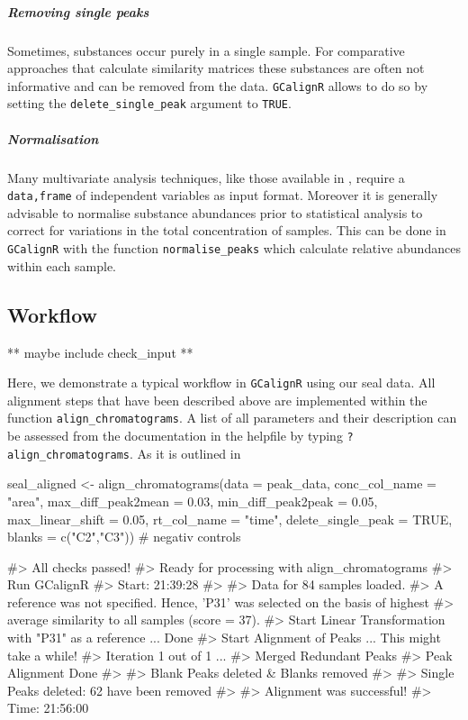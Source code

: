 \subparagraph{Removing single peaks}\label{removing-single-peaks}

Sometimes, substances occur purely in a single sample. For comparative
approaches that calculate similarity matrices these substances are often
not informative and can be removed from the data. \texttt{GCalignR}
allows to do so by setting the \texttt{delete\_single\_peak} argument to
\texttt{TRUE}.

\subparagraph{Normalisation}\label{normalisation}

Many multivariate analysis techniques, like those available in
, require a \texttt{data,frame} of independent variables as
input format. Moreover it is generally advisable to normalise substance
abundances prior to statistical analysis to correct for variations in
the total concentration of samples. This can be done in
\texttt{GCalignR} with the function \texttt{normalise\_peaks} which
calculate relative abundances within each sample.

\subsection{Workflow}\label{workflow}

** maybe include check\_input **

Here, we demonstrate a typical workflow in \texttt{GCalignR} using our
seal data. All alignment steps that have been described above are
implemented within the function \texttt{align\_chromatograms}. A list of
all parameters and their description can be assessed from the
documentation in the helpfile by typing \texttt{?align\_chromatograms}.
As it is outlined in

\begin{Schunk}
\begin{Sinput}
seal_aligned <- align_chromatograms(data = peak_data,
                    conc_col_name = "area",
                    max_diff_peak2mean = 0.03,
                    min_diff_peak2peak = 0.05,
                    max_linear_shift = 0.05,
                    rt_col_name = "time",
                    delete_single_peak = TRUE,
                    blanks = c("C2","C3")) # negativ controls
\end{Sinput}
\begin{Soutput}
#> All checks passed!
#> Ready for processing with align_chromatograms
#> Run GCalignR
#> Start: 21:39:28
#> 
#> Data for 84 samples loaded.
#> A reference was not specified. Hence, 'P31' was selected on the basis of highest
#> average similarity to all samples (score = 37).
#> Start Linear Transformation with "P31" as a reference ... Done
#> Start Alignment of Peaks ...  This might take a while!
#> Iteration 1 out of 1  ... 
#> Merged Redundant Peaks
#> Peak Alignment Done 
#> 
#> Blank Peaks deleted & Blanks removed
#> 
#> Single Peaks deleted: 62 have been removed
#> 
#> Alignment was successful!
#> Time: 21:56:00
\end{Soutput}
\end{Schunk}

